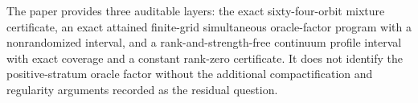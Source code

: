 The paper provides three auditable layers: the exact sixty-four-orbit mixture certificate, an exact attained finite-grid simultaneous oracle-factor program with a nonrandomized interval, and a rank-and-strength-free continuum profile interval with exact coverage and a constant rank-zero certificate.  It does not identify the positive-stratum oracle factor without the additional compactification and regularity arguments recorded as the residual question.